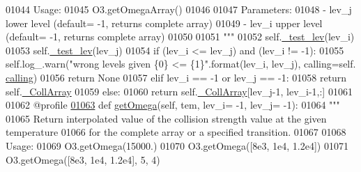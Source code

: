 \begin{DoxyCode}
{{01044 \textcolor{stringliteral}{        Usage:}
01045 \textcolor{stringliteral}{            O3.getOmegaArray()}
01046 \textcolor{stringliteral}{        }
01047 \textcolor{stringliteral}{        Parameters:}
01048 \textcolor{stringliteral}{            - lev\_j  lower level (default= -1, returns complete array)}
01049 \textcolor{stringliteral}{            - lev\_i  upper level (default= -1, returns complete array)}
01050 \textcolor{stringliteral}{}
01051 \textcolor{stringliteral}{        """}
01052         self.\hyperlink{classpyneb_1_1core_1_1pynebcore_1_1___coll_data_ascii_a932859ccd799e220c26e9f9db0cdd0a6}{\_test\_lev}(lev\_i)
01053         self.\hyperlink{classpyneb_1_1core_1_1pynebcore_1_1___coll_data_ascii_a932859ccd799e220c26e9f9db0cdd0a6}{\_test\_lev}(lev\_j)
01054         \textcolor{keywordflow}{if} (lev\_i <= lev\_j) \textcolor{keywordflow}{and} (lev\_i != -1):
01055             self.log\_.warn(\textcolor{stringliteral}{"wrong levels given \{0\} <= \{1\}"}.format(lev\_i, lev\_j), calling=self.
      \hyperlink{classpyneb_1_1core_1_1pynebcore_1_1___coll_data_ascii_a08efc5898f4e03a1b7702d85f909e188}{calling})
01056             \textcolor{keywordflow}{return} \textcolor{keywordtype}{None}
01057         \textcolor{keywordflow}{elif} lev\_i == -1 \textcolor{keywordflow}{or} lev\_j == -1:
01058             \textcolor{keywordflow}{return} self.\hyperlink{classpyneb_1_1core_1_1pynebcore_1_1___coll_data_ascii_a01539063e6fade51b407dba1faa011c6}{\_CollArray}
01059         \textcolor{keywordflow}{else}:
01060             \textcolor{keywordflow}{return} self.\hyperlink{classpyneb_1_1core_1_1pynebcore_1_1___coll_data_ascii_a01539063e6fade51b407dba1faa011c6}{\_CollArray}[lev\_j-1, lev\_i-1,:]
01061         
01062     @profile
\hypertarget{pynebcore_8py_source_l01063}{}\hyperlink{classpyneb_1_1core_1_1pynebcore_1_1___coll_data_ascii_a2f99c08a0f6a46d88b6e09b0a36495c2}{01063}     \textcolor{keyword}{def }\hyperlink{classpyneb_1_1core_1_1pynebcore_1_1___coll_data_ascii_a2f99c08a0f6a46d88b6e09b0a36495c2}{getOmega}(self, tem, lev\_i= -1, lev\_j= -1):
01064         \textcolor{stringliteral}{"""}
01065 \textcolor{stringliteral}{        Return interpolated value of the collision strength value at the given temperature }
01066 \textcolor{stringliteral}{            for the complete array or a specified transition.}
01067 \textcolor{stringliteral}{}
01068 \textcolor{stringliteral}{        Usage:}
01069 \textcolor{stringliteral}{            O3.getOmega(15000.)}
01070 \textcolor{stringliteral}{            O3.getOmega([8e3, 1e4, 1.2e4])}
01071 \textcolor{stringliteral}{            O3.getOmega([8e3, 1e4, 1.2e4], 5, 4)}
}}
\end{DoxyCode}
